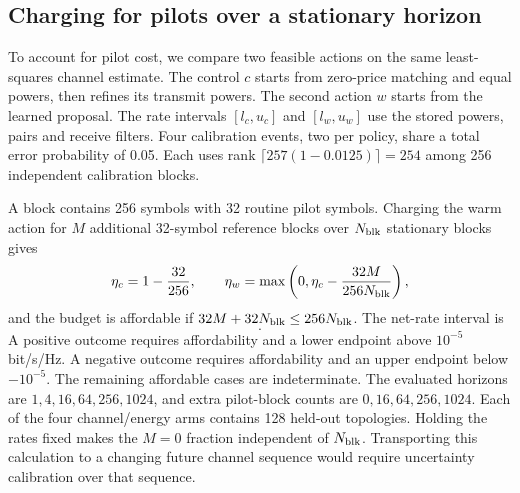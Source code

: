 \documentclass[10pt,letterpaper]{article}
\begin{document}
\subsection*{Charging for pilots over a stationary horizon}
To account for pilot cost, we compare two feasible actions on the same least-squares channel estimate. The control \(c\) starts from zero-price matching and equal powers, then refines its transmit powers. The second action \(w\) starts from the learned proposal. The rate intervals \([l_c,u_c]\) and \([l_w,u_w]\) use the stored powers, pairs and receive filters. Four calibration events, two per policy, share a total error probability of 0.05. Each uses rank \(\lceil257(1-0.0125)\rceil=254\) among 256 independent calibration blocks.

A block contains 256 symbols with 32 routine pilot symbols. Charging the warm action for \(M\) additional 32-symbol reference blocks over \(N_{\rm blk}\) stationary blocks gives
\begin{equation}
\eta_c=1-\frac{32}{256},\qquad
\eta_w=\max\left(0,\eta_c-\frac{32M}{256N_{\rm blk}}\right),
\end{equation}
and the budget is affordable if \(32M+32N_{\rm blk}\leq256N_{\rm blk}\). The net-rate interval is
\begin{equation}
[\eta_w l_w-\eta_c u_c,\ \eta_w u_w-\eta_c l_c].
\end{equation}
A positive outcome requires affordability and a lower endpoint above \(10^{-5}\) bit/s/Hz. A negative outcome requires affordability and an upper endpoint below \(-10^{-5}\). The remaining affordable cases are indeterminate. The evaluated horizons are \(1,4,16,64,256,1024\), and extra pilot-block counts are \(0,16,64,256,1024\). Each of the four channel/energy arms contains 128 held-out topologies. Holding the rates fixed makes the \(M=0\) fraction independent of \(N_{\rm blk}\). Transporting this calculation to a changing future channel sequence would require uncertainty calibration over that sequence.
\end{document}

